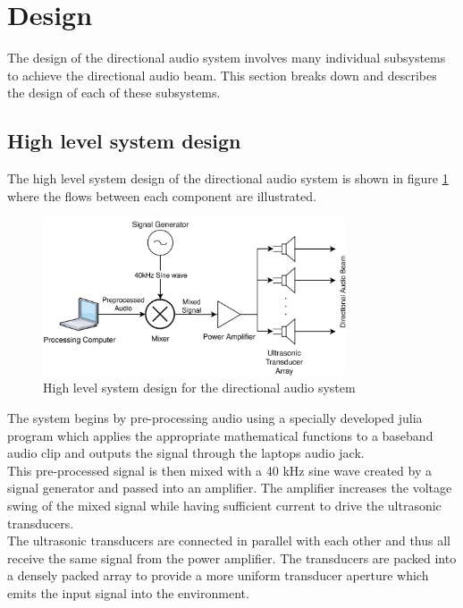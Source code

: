\section{Design}
The design of the directional audio system involves many individual subsystems to achieve the directional audio beam. This section breaks down and describes the design of each of these subsystems.
\subsection{High level system design}
The high level system design of the directional audio system is shown in figure \ref{fig:highleveldesign} where the flows between each component are illustrated. 
\begin{figure}[h]
    \centering
    \includegraphics[width=0.8\textwidth]{Figures/Design/HighlevelSystemDesign.png}
    \caption{High level system design for the directional audio system}
    \label{fig:highleveldesign}
\end{figure}
The system begins by pre-processing audio using a specially developed julia program which applies the appropriate mathematical functions to a baseband audio clip and outputs the signal through the laptops audio jack.\\
This pre-processed signal is then mixed with a 40 kHz sine wave created by a signal generator and passed into an amplifier. The amplifier increases the voltage swing of the mixed signal while having sufficient current to drive the ultrasonic transducers.\\
The ultrasonic transducers are connected in parallel with each other and thus all receive the same signal from the power amplifier. The transducers are packed into a densely packed array to provide a more uniform transducer aperture which emits the input signal into the environment.
